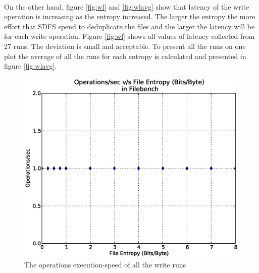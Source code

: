 \paragraph{}
On the other hand, figure \ref{fig:wl} and \ref{fig:wlavg} show that latency of the write operation is increasing as the entropy increased. The larger the entropy the more effort that SDFS spend to deduplicate the files and the larger the latency will be for each write operation. Figure \ref{fig:wl} shows all values of latency collected from 27 runs. The deviation is small and acceptable. To present all the runs on one plot the average of all the runs for each entropy is calculated and presented in figure \ref{fig:wlavg}.

\begin{figure}[H]
\begin{center}
\includegraphics[scale=.55]{../results/set2/write_ops_2.eps}
\caption{The operations execution-speed of all the write runs}
\label{fig:wops}
\end{center}
\end{figure}


